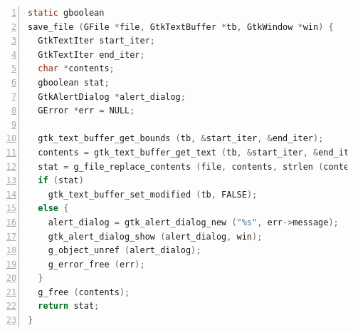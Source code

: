 \begin{lstlisting}[language=C, numbers=left]
static gboolean
save_file (GFile *file, GtkTextBuffer *tb, GtkWindow *win) {
  GtkTextIter start_iter;
  GtkTextIter end_iter;
  char *contents;
  gboolean stat;
  GtkAlertDialog *alert_dialog;
  GError *err = NULL;

  gtk_text_buffer_get_bounds (tb, &start_iter, &end_iter);
  contents = gtk_text_buffer_get_text (tb, &start_iter, &end_iter, FALSE);
  stat = g_file_replace_contents (file, contents, strlen (contents), NULL, TRUE, G_FILE_CREATE_NONE, NULL, NULL, &err);
  if (stat)
    gtk_text_buffer_set_modified (tb, FALSE);
  else {
    alert_dialog = gtk_alert_dialog_new ("%s", err->message);
    gtk_alert_dialog_show (alert_dialog, win);
    g_object_unref (alert_dialog);
    g_error_free (err);
  }
  g_free (contents);
  return stat;
}
\end{lstlisting}

